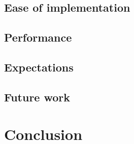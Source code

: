 \documentclass[a4paper,titlepage]{article}
\begin{document}
\subsection{Ease of implementation}

\subsection{Performance}

\subsection{Expectations}

\subsection{Future work}

\section{Conclusion}
\label{sec:conclusion}

{}

\end{document}
